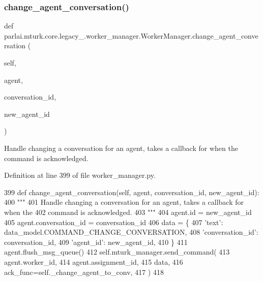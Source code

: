 \subsubsection{\texorpdfstring{change\+\_\+agent\+\_\+conversation()}{change\_agent\_conversation()}}
{\footnotesize\ttfamily def parlai.\+mturk.\+core.\+legacy\+\_.\+worker\+\_\+manager.\+Worker\+Manager.\+change\+\_\+agent\+\_\+conversation (\begin{DoxyParamCaption}\item[{}]{self,  }\item[{}]{agent,  }\item[{}]{conversation\+\_\+id,  }\item[{}]{new\+\_\+agent\+\_\+id }\end{DoxyParamCaption})}

\begin{DoxyVerb}Handle changing a conversation for an agent, takes a callback for when the
command is acknowledged.
\end{DoxyVerb}
 

Definition at line 399 of file worker\+\_\+manager.\+py.


\begin{DoxyCode}
399     \textcolor{keyword}{def }change\_agent\_conversation(self, agent, conversation\_id, new\_agent\_id):
400         \textcolor{stringliteral}{"""}
401 \textcolor{stringliteral}{        Handle changing a conversation for an agent, takes a callback for when the}
402 \textcolor{stringliteral}{        command is acknowledged.}
403 \textcolor{stringliteral}{        """}
404         agent.id = new\_agent\_id
405         agent.conversation\_id = conversation\_id
406         data = \{
407             \textcolor{stringliteral}{'text'}: data\_model.COMMAND\_CHANGE\_CONVERSATION,
408             \textcolor{stringliteral}{'conversation\_id'}: conversation\_id,
409             \textcolor{stringliteral}{'agent\_id'}: new\_agent\_id,
410         \}
411         agent.flush\_msg\_queue()
412         self.mturk\_manager.send\_command(
413             agent.worker\_id,
414             agent.assignment\_id,
415             data,
416             ack\_func=self.\_change\_agent\_to\_conv,
417         )
418 
\end{DoxyCode}
\mbox{\label{classparlai_1_1mturk_1_1core_1_1legacy__2018_1_1worker__manager_1_1WorkerManager_ab0fb35b45a7c64d79e9a2f61479fcf8b}} 
